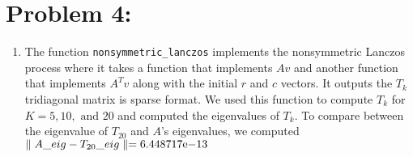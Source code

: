 \newpage
\section*{Problem 4:}
\begin{enumerate}
\item The function \texttt{nonsymmetric\_lanczos} implements the nonsymmetric Lanczos process where it takes a function that implements $Av$ and another function that implements $A^{T}v$ along with the initial $r$ and $c$ vectors. It outputs the $T_{k}$ tridiagonal matrix is sparse format. We used this function to compute $T_{k} $ for $K=5, 10, \text{\ and\ } 20$ and computed the eigenvalues of $T_{k}$. To compare between the eigenvalue of $T_{20}$ and $A$'s eigenvalues, we computed $\parallel A\_eig - T_{20}\_eig\parallel ={6.448717}\mathrm{e}{-13}$



\end{enumerate}
